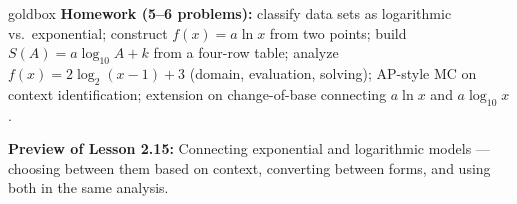 \documentclass[10pt]{article}
\begin{document}
\begin{skillbox}{goldbox}
\textbf{Homework (5--6 problems):} classify data sets as logarithmic vs.\ exponential;
construct $f(x) = a\ln x$ from two points; build $S(A) = a\log_{10} A + k$ from a four-row
table; analyze $f(x) = 2\log_2(x-1)+3$ (domain, evaluation, solving); AP-style MC on
context identification; extension on change-of-base connecting $a\ln x$ and $a\log_{10} x$.

\textbf{Preview of Lesson 2.15:} Connecting exponential and logarithmic models --- choosing
between them based on context, converting between forms, and using both in the same analysis.
\end{skillbox}
\end{document}
